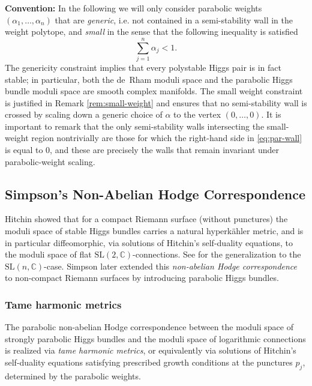 \documentclass[12pt,a4paper]{amsart}
\theoremstyle{definition}
\theoremstyle{remark}
\newcommand{\C}{\mathbb C}
\begin{document}
 {\bf Convention:} 
In the following we will only consider parabolic weights $(\alpha_1,\dots,\alpha_n)$ that are \emph{generic}, i.e. not contained in a semi-stability wall in the weight polytope, and \emph{small} in the sense that the following inequality is satisfied
 \begin{equation}\label{eq:polygon-wall}
 \sum_{j=1}^{n}\alpha_{j}<1.
 \end{equation}
The genericity constraint implies that every polystable Higgs pair is in fact stable; in particular, both the de~Rham moduli space and the parabolic Higgs bundle moduli space are smooth complex manifolds. The small weight constraint is justified in Remark \ref{rem:small-weight} and ensures that no semi-stability wall is crossed by scaling down a generic choice of $\alpha$ to the vertex $(0,\dots,0)$. It is important to remark that the only semi-stability walls intersecting the small-weight region nontrivially are those for which the right-hand side in \eqref{eq:par-wall} is equal to 0, and these are precisely the walls that remain invariant under parabolic-weight scaling. 


\subsection{Simpson's Non-Abelian Hodge Correspondence}
Hitchin \cite{Hitchin1987} showed that for a compact Riemann surface (without punctures) the moduli space of stable Higgs bundles carries a natural hyperk\"ahler metric, and is in particular diffeomorphic, via solutions of Hitchin's self-duality equations, to the moduli space of flat $\mathrm{SL}(2,\C)$-connections.
See \cite{Sim1} for the generalization to the $\mathrm{SL}(n,\C)$-case.
Simpson \cite{Sim2} later extended this \emph{non-abelian Hodge correspondence} to non-compact Riemann surfaces by introducing parabolic Higgs bundles.






\subsubsection*{Tame harmonic metrics}
The parabolic non-abelian Hodge correspondence between the moduli space of strongly parabolic Higgs bundles and the moduli space of logarithmic connections is realized via \emph{tame harmonic metrics}, or equivalently via solutions of Hitchin's self-duality equations satisfying prescribed growth conditions at the punctures $p_j$, determined by the parabolic weights.
\end{document}
